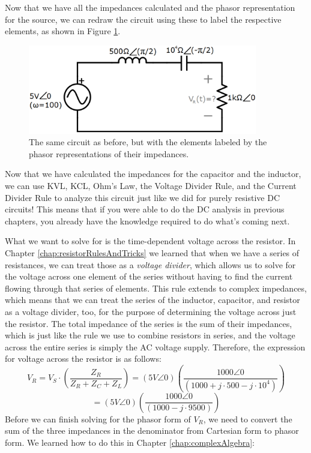 \par
Now that we have all the impedances calculated and the phasor representation for the source, we can redraw the circuit using these to label the respective elements, as shown in Figure \ref{myFirstACCircuit2}.
\begin{figure}[h!]
\centering
\includegraphics[width=10cm]{figures/firstACCircuit2.png}
\caption{The same circuit as before, but with the elements labeled by the phasor representations of their impedances.}
\label{myFirstACCircuit2}
\end{figure}
 Now that we have calculated the impedances for the capacitor and the inductor, we can use KVL, KCL, Ohm's Law, the Voltage Divider Rule, and the Current Divider Rule to analyze this circuit just like we did for purely resistive DC circuits! This means that if you were able to do the DC analysis in previous chapters, you already have the knowledge required to do what's coming next. 
 \par
 What we want to solve for is the time-dependent voltage across the resistor. In Chapter \ref{chap:resistorRulesAndTricks} we learned that when we have a series of resistances, we can treat those as a \textit{voltage divider}, which allows us to solve for the voltage across one element of the series without having to find the current flowing through that series of elements. This rule extends to complex impedances, which means that we can treat the series of the inductor, capacitor, and resistor as a voltage divider, too, for the purpose of determining the voltage across just the resistor. The total impedance of the series is the sum of their impedances, which is just like the rule we use to combine resistors in series, and  the voltage across the entire series is simply the AC voltage supply. Therefore, the expression for voltage across the resistor is as follows:
 $$
V_R = V_S\cdot\left(\frac{Z_R}{Z_R+Z_C+Z_L}\right)=(5V\angle0)\left(\frac{1000\angle0}{(1000 + j\cdot500 - j\cdot10^4)}\right)
$$
$$
=(5V\angle0)\left(\frac{1000\angle0}{(1000 - j\cdot9500)}\right)
 $$
Before we can finish solving for the phasor form of $V_R$, we need to convert the sum of the three impedances in the denominator from Cartesian form to phasor form. We learned how to do this in Chapter \ref{chap:complexAlgebra}:
